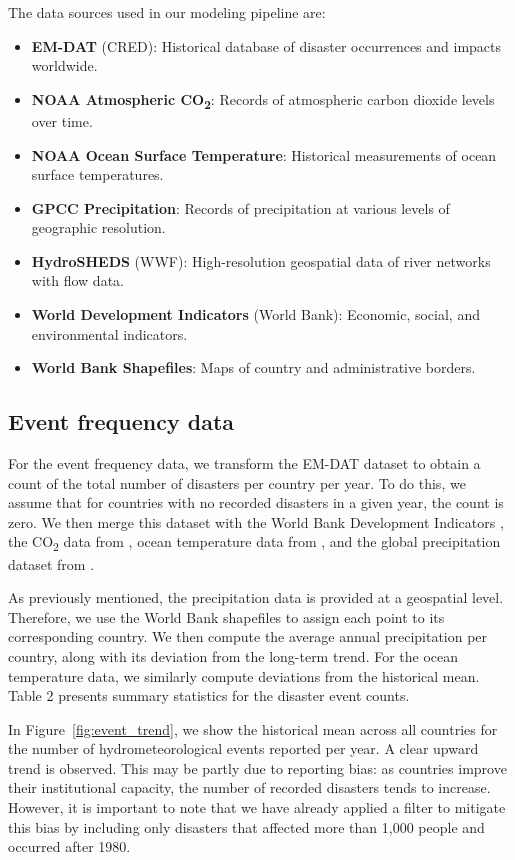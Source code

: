 The data sources used in our modeling pipeline are:
\begin{itemize}
    \item \textbf{EM-DAT} (CRED): Historical database of disaster occurrences and impacts worldwide.
    \item \textbf{NOAA Atmospheric CO\textsubscript{2}}: Records of atmospheric carbon dioxide levels over time.
    \item \textbf{NOAA Ocean Surface Temperature}: Historical measurements of ocean surface temperatures.
    \item \textbf{GPCC Precipitation}: Records of precipitation at various levels of geographic resolution.
    \item \textbf{HydroSHEDS} (WWF): High-resolution geospatial data of river networks with flow data.
    \item \textbf{World Development Indicators} (World Bank): Economic, social, and environmental indicators.
    \item \textbf{World Bank Shapefiles}: Maps of country and administrative borders.
\end{itemize}

\subsection{Event frequency data}

For the event frequency data, we transform the EM-DAT dataset to obtain a count of the total number of disasters per country per year. To do this, we assume that for countries with no recorded disasters in a given year, the count is zero. We then merge this dataset with the World Bank Development Indicators \citep{worldbank_wdi_2024}, the CO\textsubscript{2} data from \citet{noaa_co2_2024}, ocean temperature data from \citet{zhang_noaa_2019}, and the global precipitation dataset from \citet{gpcc_2022}.

As previously mentioned, the precipitation data is provided at a geospatial level. Therefore, we use the World Bank shapefiles to assign each point to its corresponding country. We then compute the average annual precipitation per country, along with its deviation from the long-term trend. For the ocean temperature data, we similarly compute deviations from the historical mean. Table 2 presents summary statistics for the disaster event counts.



In Figure~\ref{fig:event_trend}, we show the historical mean across all countries for the number of hydrometeorological events reported per year. A clear upward trend is observed. This may be partly due to reporting bias: as countries improve their institutional capacity, the number of recorded disasters tends to increase. However, it is important to note that we have already applied a filter to mitigate this bias by including only disasters that affected more than 1,000 people and occurred after 1980.

